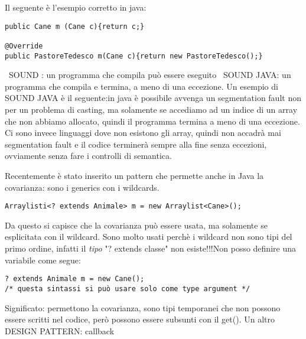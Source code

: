 \noindent Il seguente è l'esempio corretto in java:
\begin{lstlisting}[basicstyle=\small,]
public Cane m (Cane c){return c;}

@Override
public PastoreTedesco m(Cane c){return new PastoreTedesco();}
\end{lstlisting}

\noindent \textbullet\ SOUND : un programma che compila può essere eseguito \newline
\textbullet\ SOUND JAVA: un programma che compila e termina, a meno di una eccezione. \newline
Un esempio di SOUND JAVA è il seguente:in java è possibile avvenga un segmentation fault non per un problema di casting, ma solamente se accediamo ad un indice di un array che non abbiamo allocato, quindi il programma termina a meno di una eccezione. Ci sono invece linguaggi dove non esistono gli array, quindi non accadrà mai segmentation fault e il codice terminerà sempre alla fine senza eccezioni, ovviamente senza fare i controlli di semantica. 


\noindent Recentemente è stato inserito un pattern che permette anche in Java la covarianza: sono i generics con i wildcards. 
\begin{lstlisting}[basicstyle=\small,]
Arraylisti<? extends Animale> m = new Arraylist<Cane>();
\end{lstlisting}
Da questo si capisce che la covarianza può essere usata, ma solamente se esplicitata con il wildcard. \newline
Sono molto usati perchè i wildcard non sono tipi del primo ordine, infatti il \textit{tipo} "? extends classe" non esiste!!!Non posso definire una variabile come segue: 
\begin{lstlisting}[basicstyle=\small,]
? extends Animale m = new Cane();
/* questa sintassi si può usare solo come type argument */
\end{lstlisting}
Significato: permettono la covarianza, sono tipi temporanei che non possono essere scritti nel codice, però possono essere subsunti con il get(). \newline
Un altro DESIGN PATTERN: callback














